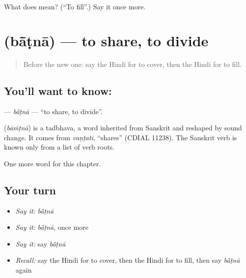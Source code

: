 \begin{tcolorbox}[breakable,colback=teal!4,colframe=teal!35!black,title={Before you move on}]
What does  mean? (\textquotedblleft{}To fill\textquotedblright{}.) Say it once more.
\end{tcolorbox}
\section[\texorpdfstring{\hi{बाँटना} (bā̃ṭnā)}{बाँटना (bā̃ṭnā)}]{ (bā̃ṭnā) — to share, to divide}

\label{lesson:HI-C173-batna}



\begin{quote}
Before the new one: say the Hindi for to cover, then the Hindi for to fill.
\end{quote}

\subsection*{You'll want to know: }
\textbf{} — \emph{bā̃ṭnā} — \textquotedblleft{}to share, to divide\textquotedblright{}.

\begin{cousinweb}
\textbf{} (\emph{bāṁṭnā}) is a tadbhava, a word inherited from Sanskrit and reshaped by sound change. It comes from \emph{vaṇṭati}, \textquotedblleft{}shares\textquotedblright{} (CDIAL 11238). The Sanskrit verb is known only from a list of verb roots.
\end{cousinweb}

\begin{grammarlens}[title={What you've built}]
One more word for this chapter.
\end{grammarlens}

\subsection*{Your turn}
\begin{itemize}
\raggedright
  \item \emph{Say it:} \emph{bā̃ṭnā}
  \item \emph{Say it:} \emph{bā̃ṭnā}, once more
  \item \emph{Say it:} say \emph{bā̃ṭnā}
  \item \emph{Recall:} say the Hindi for to cover, then the Hindi for to fill, then say \emph{bā̃ṭnā} again
\end{itemize}

